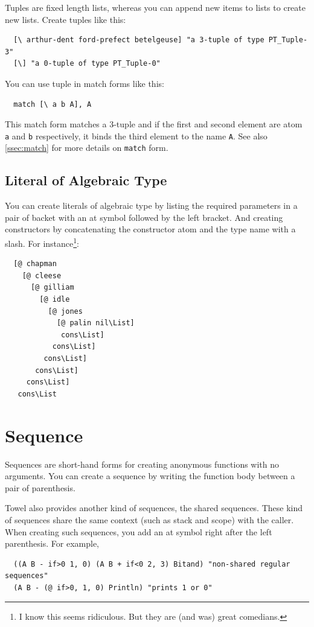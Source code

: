 \documentclass{book}
\begin{document}
Tuples are fixed length lists, whereas you can append new items to lists to create new lists. Create tuples like this:
\begin{verbatim}
  [\ arthur-dent ford-prefect betelgeuse] "a 3-tuple of type PT_Tuple-3"
  [\] "a 0-tuple of type PT_Tuple-0"
\end{verbatim}

You can use tuple in match forms like this:
\begin{verbatim}
  match [\ a b A], A
\end{verbatim}
This match form matches a 3-tuple and if the first and second element are atom \texttt{a} and \texttt{b} respectively, it binds the third element to the name \texttt{A}. See also \autoref{ssec:match} for more details on \texttt{match} form.

\subsection{Literal of Algebraic Type}

You can create literals of algebraic type by listing the required parameters in a pair of backet with an at symbol followed by the left bracket. And creating constructors by concatenating the constructor atom and the type name with a slash. For instance\footnote{I know this seems ridiculous. But they are (and was) great comedians.}:
\begin{verbatim}
  [@ chapman
    [@ cleese
      [@ gilliam
        [@ idle
          [@ jones
            [@ palin nil\List]
             cons\List]
           cons\List]
         cons\List]
       cons\List]
     cons\List]
   cons\List
\end{verbatim}

\section{Sequence}

Sequences are short-hand forms for creating anonymous functions with no arguments. You can create a sequence by writing the function body between a pair of parenthesis.

Towel also provides another kind of sequences, the shared sequences. These kind of sequences share the same context (such as stack and scope) with the caller. When creating such sequences, you add an at symbol right after the left parenthesis. For example,
\begin{verbatim}
  ((A B - if>0 1, 0) (A B + if<0 2, 3) Bitand) "non-shared regular sequences"
  (A B - (@ if>0, 1, 0) Println) "prints 1 or 0"
\end{verbatim}
\end{document}
